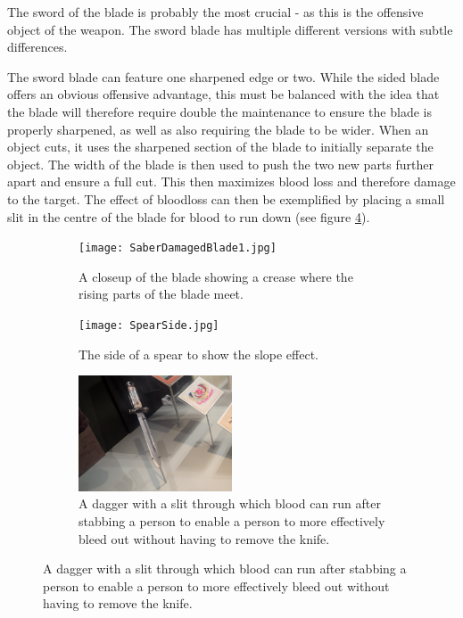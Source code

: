 \documentclass{article}
\begin{document}
The sword of the blade is probably the most crucial - as this is the offensive object of the weapon. The sword blade has multiple different versions with subtle differences.

The sword blade can feature one sharpened edge or two. While the sided blade offers an obvious offensive advantage, this must be balanced with the idea that the blade will therefore require double the maintenance to ensure the blade is properly sharpened, as well as also requiring the blade to be wider. When an object cuts, it uses the sharpened section of the blade to initially separate the object. The width of the blade is then used to push the two new parts further apart and ensure a full cut. This then maximizes blood loss and therefore damage to the target. The effect of bloodloss can then be exemplified by placing a small slit in the centre of the blade for blood to run down (see figure \ref{fig:swordSlit}). 

\begin{figure}[h]
    \centering
    \caption{}
    \begin{subfigure}{0.49\textwidth}
        \texttt{[image: SaberDamagedBlade1.jpg]}
        \caption{A closeup of the blade showing a crease where the rising parts of the blade meet.}
        \label{fig:SwordCrease}
    \end{subfigure}
    \begin{subfigure}{0.49\textwidth}
        \texttt{[image: SpearSide.jpg]}
        \caption{The side of a spear to show the slope effect.}
        \label{fig:SpearSide}
    \end{subfigure}
    \begin{subfigure}{\textwidth}
        \centering
        \includegraphics[width=0.5\textwidth]{Dagger2.jpg}
        \caption{A dagger with a slit through which blood can run after stabbing a person to enable a person to more effectively bleed out without having to remove the knife.}
        \label{fig:swordSlit}
    \end{subfigure}
\end{figure}
\end{document}
